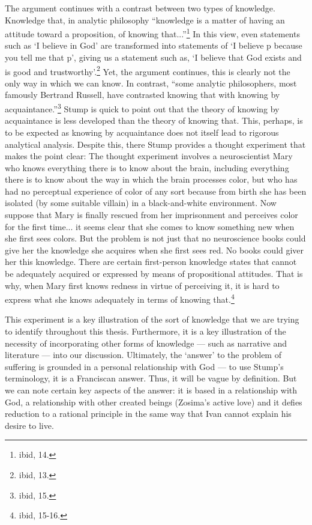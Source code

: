 The argument continues with a contrast between two types of knowledge. Knowledge that, in analytic philosophy ``knowledge is a matter of having an attitude toward a proposition, of knowing that...''\footnote{ibid, 14.} In this view, even statements such as `I believe in God' are transformed into statements of `I believe p because you tell me that p', giving us a statement such as, `I believe that God exists and is good and trustworthy'.\footnote{ibid, 13.} Yet, the argument continues, this is clearly not the only way in which we can know. In contrast, ``some analytic philosophers, most famously Bertrand Russell, have contrasted knowing that with knowing by acquaintance.''\footnote{ibid, 15.} Stump is quick to point out that the theory of knowing by acquaintance is less developed than the theory of knowing that. This, perhaps, is to be expected as knowing by acquaintance does not itself lead to rigorous analytical analysis. Despite this, there Stump provides a thought experiment that makes the point clear:
The thought experiment involves a neuroscientist Mary who knows everything there is to know about the brain, including everything there is to know about the way in which the brain processes color, but who has had no perceptual experience of color of any sort because from birth she has been isolated (by some suitable villain) in a black-and-white environment. Now suppose that Mary is finally rescued from her imprisonment and perceives color for the first time... it seems clear that she comes to know something new when she first sees colors. But the problem is not just that no neuroscience books could give her the knowledge she acquires when she first sees red. No books could giver her this knowledge. There are certain first-person knowledge states that cannot be adequately acquired or expressed by means of propositional attitudes. That is why, when Mary first knows redness in virtue of perceiving it, it is hard to express what she knows adequately in terms of knowing that.\footnote{ibid, 15-16.}

This experiment is a key illustration of the sort of knowledge that we are trying to identify throughout this thesis. Furthermore, it is a key illustration of the necessity of incorporating other forms of knowledge --- such as narrative and literature --- into our discussion. Ultimately, the `answer' to the problem of suffering is grounded in a personal relationship with God --- to use Stump's terminology, it is a Franciscan answer. Thus, it will be vague by definition. But we can note certain key aspects of the answer: it is based in a relationship with God, a relationship with other created beings (Zosima's active love) and it defies reduction to a rational principle in the same way that Ivan cannot explain his desire to live.

